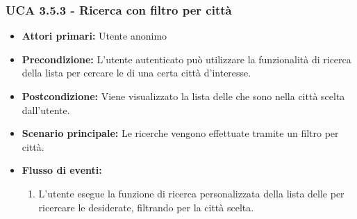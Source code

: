 \subsubsection{UCA 3.5.3 - Ricerca con filtro per città}%
\begin{itemize}
	\item \textbf{Attori primari:} Utente anonimo
	\item \textbf{Precondizione:} L'utente autenticato può utilizzare la funzionalità di ricerca della lista per cercare le  di una certa città d'interesse.
	\item \textbf{Postcondizione:} Viene visualizzato la lista delle  che sono nella città scelta dall'utente.
	\item \textbf{Scenario principale:} Le ricerche vengono effettuate tramite un filtro per città.
	\item \textbf{Flusso di eventi:}
	\begin{enumerate}
		\item L'utente esegue la funzione di ricerca personalizzata della lista delle  per ricercare le  desiderate, filtrando per la città scelta.
	\end{enumerate}
\end{itemize}